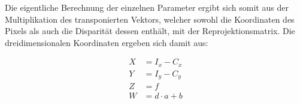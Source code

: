 \noindent
Die eigentliche Berechnung der einzelnen Parameter ergibt sich somit aus der Multiplikation des transponierten Vektors, welcher sowohl die Koordinaten des Pixels als auch die Disparität dessen enthält, mit der Reprojektionsmatrix. Die dreidimensionalen Koordinaten ergeben sich damit aus:

\begin{equation}
  \begin{aligned}
        X &= I_x - C_x\\
        Y &= I_y - C_y\\
        Z &= f\\
        W &= d \cdot a + b
  \end{aligned}
\end{equation}